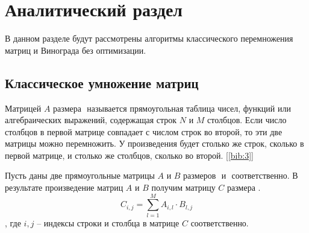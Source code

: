 \chapter{Аналитический раздел}
\label{cha:analytical}
	\par В данном разделе будут рассмотрены алгоритмы классического перемножения матриц и Винограда без оптимизации.
    \section{Классическое умножение матриц}
	\par Матрицей \begin{math}A\end{math} размера \begin{math}[N \cdot M]\end{math} называется прямоугольная таблица чисел, функций или алгебраических выражений, содержащая строк \begin{math}N\end{math}  и \begin{math}M\end{math}  столбцов. Если число столбцов в первой матрице совпадает с числом строк во второй, то эти две матрицы можно перемножить. У произведения будет столько же строк, сколько в первой матрице, и столько же столбцов, сколько во второй. [\ref{bib:3}]
	\par Пусть даны две прямоугольные матрицы \begin{math}A\end{math} и \begin{math}B\end{math} размеров \begin{math}[N \cdot M]\end{math} и \begin{math}[M \cdot K]\end{math} соответственно. В результате произведение матриц \begin{math}A\end{math} и \begin{math}B\end{math} получим матрицу \begin{math}C\end{math} размера \begin{math}[N \cdot K]\end{math}.
	\begin{equation}\label{formula:ClassicMult}
	C_{i,j} = \sum_{l=1}^{M} A_{i,l} \cdot B_{l,j}
	\end{equation},
	где \begin{math}i,j\end{math} -- индексы строки и столбца в матрице \begin{math}C\end{math} соответственно.
